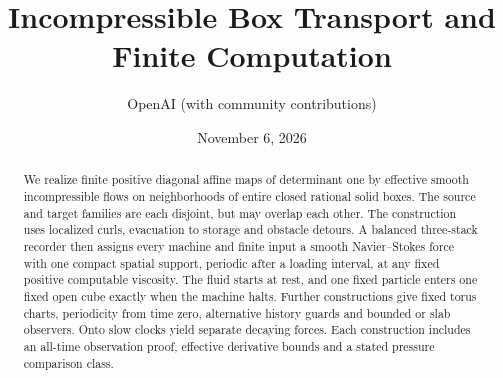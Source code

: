 \documentclass[11pt]{article}
\title{Incompressible Box Transport and Finite Computation}
\author{OpenAI (with community contributions)}
\date{November 6, 2026}
\theoremstyle{definition}\newtheorem{definition}[theorem]{Definition}
\theoremstyle{remark}\newtheorem{remark}[theorem]{Remark}
\begin{document}
\maketitle
\begin{abstract}
We realize finite positive diagonal affine maps of determinant one by
effective smooth incompressible flows on neighborhoods of entire closed
rational solid boxes. The source and target families are each disjoint, but may
overlap each other. The construction uses localized curls, evacuation to
storage and obstacle detours. A balanced three-stack recorder then assigns
every machine and finite input a smooth Navier--Stokes force with one
compact spatial support, periodic after a loading interval, at any fixed
positive computable viscosity. The fluid starts at rest, and one fixed
particle enters one fixed open cube exactly when the machine halts.
Further constructions give fixed torus charts, periodicity from time zero,
alternative history guards and bounded or slab observers. Onto slow clocks
yield separate decaying forces. Each construction includes an all-time
observation proof, effective derivative bounds and a stated pressure
comparison class.
\end{abstract}

















\end{document}

